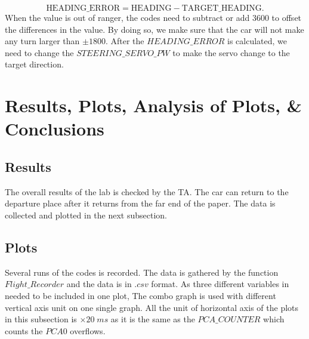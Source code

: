 \documentclass[12pt]{article}
\begin{document}
\begin{equation*}
\text{HEADING\_ERROR} = \text{HEADING} - \text{TARGET\_HEADING}.
\end{equation*}
When the value is out of ranger, the codes need to subtract or add 3600 to offset the differences in the value. By doing so, we make sure that the car will not make any turn larger than $\pm 1800.$ After the $HEADING\_ERROR$ is calculated, we need to change the $STEERING\_SERVO\_PW$ to make the servo change to the target direction.\par

\newpage
\section{Results, Plots, Analysis of Plots, \& Conclusions}
\subsection{Results}
The overall results of the lab is checked by the TA. The car can return to the departure place after it returns from the far end of the paper. The data is collected and plotted in the next subsection.
\subsection{Plots}
Several runs of the codes is recorded. The data is gathered by the function $Flight\_Recorder$ and the data is in $.csv$ format. As three different variables in needed to be included in one plot, The combo graph is used with different vertical axis unit on one single graph. All the unit of horizontal axis of the plots in this subsection is $\times20\;ms$ as it is the same as the $PCA\_COUNTER$ which counts the $PCA0$ overflows.
\newpage
\end{document}
